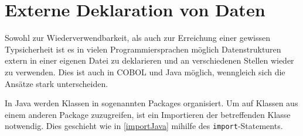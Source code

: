 \section{Externe Deklaration von Daten}

Sowohl zur Wiederverwendbarkeit, als auch zur Erreichung einer gewissen Typsicherheit ist es in vielen Programmiersprachen möglich Datenstrukturen extern in einer eigenen Datei zu deklarieren und an verschiedenen Stellen wieder zu verwenden. Dies ist auch in COBOL und Java möglich, wenngleich sich die Ansätze stark unterscheiden.

In Java werden Klassen in sogenannten Packages organisiert. Um auf Klassen aus einem anderen Package zuzugreifen, ist ein Importieren der betreffenden Klasse notwendig. Dies geschieht wie in \autoref{importJava} mihilfe des \texttt{import}-Statements.

